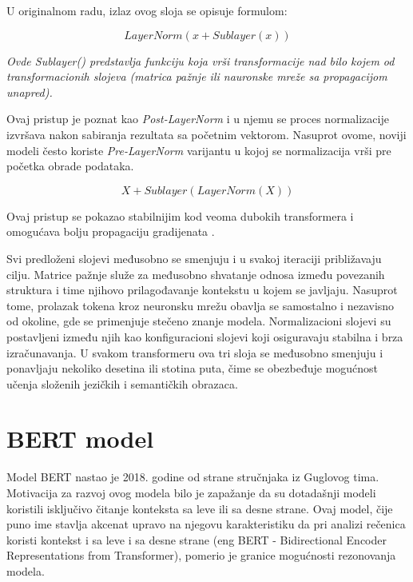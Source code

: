 \documentclass[12pt,oneside]{memoir}
\begin{document}
U originalnom radu, izlaz ovog sloja se opisuje formulom:

\begin{equation}
LayerNorm(x + Sublayer(x))
\end{equation}

\textit{Ovde Sublayer() predstavlja funkciju koja vrši transformacije nad bilo kojem od transformacionih slojeva (matrica pažnje ili nauronske mreže sa propagacijom unapred).}

Ovaj pristup je poznat kao \textit{Post-LayerNorm} i u njemu se proces normalizacije izvršava nakon sabiranja rezultata sa početnim vektorom. Nasuprot ovome, noviji modeli često koriste \textit{Pre-LayerNorm} varijantu u kojoj se normalizacija vrši pre početka obrade podataka.

\begin{equation}
	X+Sublayer(LayerNorm(X))
\end{equation}

Ovaj pristup se pokazao stabilnijim kod veoma dubokih transformera i omogućava bolju propagaciju gradijenata \cite{LayerNorm}.


\vspace{1cm}
Svi predloženi slojevi međusobno se smenjuju i u svakoj iteraciji približavaju cilju. Matrice pažnje služe za međusobno shvatanje odnosa između povezanih struktura i time njihovo prilagođavanje kontekstu u kojem se javljaju. Nasuprot tome, prolazak tokena kroz neuronsku mrežu obavlja se samostalno i nezavisno od okoline, gde se primenjuje stečeno znanje modela. Normalizacioni slojevi su postavljeni između njih kao konfiguracioni slojevi koji osiguravaju stabilna i brza izračunavanja. U svakom transformeru ova tri sloja se međusobno smenjuju i ponavljaju nekoliko desetina ili stotina puta, čime se obezbeđuje mogućnost učenja složenih jezičkih i semantičkih obrazaca.   

\section {BERT model}
Model BERT\cite{BertModel} nastao je 2018. godine od strane stručnjaka iz Guglovog tima. Motivacija za razvoj ovog modela bilo je zapažanje da su dotadašnji modeli koristili isključivo čitanje konteksta sa leve ili sa desne strane. Ovaj model, čije puno ime stavlja akcenat upravo na njegovu karakteristiku da pri analizi rečenica koristi kontekst i sa leve i sa desne strane (eng BERT - Bidirectional Encoder Representations from Transformer), pomerio je granice mogućnosti rezonovanja modela. 
\end{document}
